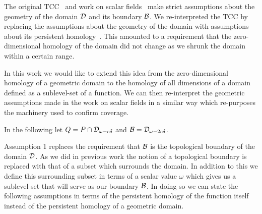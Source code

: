 The original TCC~\cite{desilva07coverage} and work on scalar fields~\cite{chazal09analysis} make strict assumptions about the geometry of the domain ${\mathcal{D}}$ and its boundary ${\mathcal{B}}$.
We re-interpreted the TCC by replacing the assumptions about the geometry of the domain with assumptions about its persistent homology~\cite{cavanna2017when}.
This amounted to a requirement that the zero-dimensional homology of the domain did not change as we shrunk the domain within a certain range.

In this work we would like to extend this idea from the zero-dimensional homology of a geometric domain to the homology of all dimensions of a domain defined as a sublevel-set of a function.
We can then re-interpret the geometric assumptions made in the work on scalar fields in a similar way which re-purposes the machinery used to confirm coverage.

\vspace{2ex}
\begin{center}
\setlength{\fboxsep}{2ex}
\end{center}\vspace{4ex}

In the following let $Q = P\cap {\mathcal{D}}_{\omega - c\delta}$ and ${\mathcal{B}} = {\mathcal{D}}_{\omega-2c\delta}$.

Assumption 1 replaces the requirement that ${\mathcal{B}}$ is the topological boundary of the domain ${\mathcal{D}}$.
As we did in previous work the notion of a topological boundary is replaced with that of a subset which surrounds the domain.
In addition to this we define this surrounding subset in terms of a scalar value $\omega$ which gives us a sublevel set that will serve as our boundary ${\mathcal{B}}$.
In doing so we can state the following assumptions in terms of the persistent homology of the function itself instead of the persistent homology of a geometric domain.

